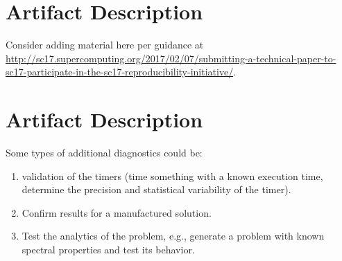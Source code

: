 
\section{Artifact Description} \label{sec:appendix/artifacts}

Consider adding material here per guidance at
\url{http://sc17.supercomputing.org/2017/02/07/submitting-a-technical-paper-to-sc17-participate-in-the-sc17-reproducibility-initiative/}.

\section{Artifact Description} \label{sec:appendix/analysis}

Some types of additional diagnostics could be:
\begin{enumerate}
\item validation of the timers (time something with a known execution time, determine the precision and statistical variability of the timer).
\item Confirm results for a manufactured solution.
\item Test the analytics of the problem, e.g., generate a problem with known spectral properties and test its behavior.
\end{enumerate}
